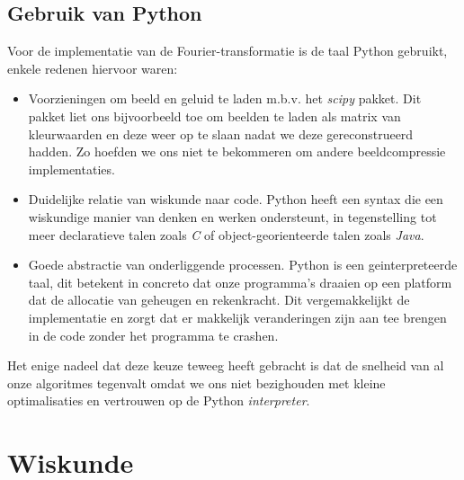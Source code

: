 \subsection{Gebruik van Python}
Voor de implementatie van de Fourier-transformatie is de taal Python gebruikt,
enkele redenen hiervoor waren:
\begin{itemize}
\item Voorzieningen om beeld en geluid te laden m.b.v. het \emph{scipy} pakket.
  Dit pakket liet ons bijvoorbeeld toe om beelden te laden als matrix van kleurwaarden en deze weer op te slaan
  nadat we deze gereconstrueerd hadden. Zo hoefden we ons niet te bekommeren om andere beeldcompressie implementaties.
\item Duidelijke relatie van wiskunde naar code. Python heeft een syntax die een wiskundige manier van denken en werken
  ondersteunt, in tegenstelling tot meer declaratieve talen zoals \emph{C} of object-georienteerde talen zoals \emph{Java}.
\item Goede abstractie van onderliggende processen. Python is een geinterpreteerde taal, dit betekent in concreto
  dat onze programma's draaien op een platform dat de allocatie van geheugen en rekenkracht. Dit vergemakkelijkt
  de implementatie en zorgt dat er makkelijk veranderingen zijn aan tee brengen in de code zonder het programma te crashen.
\end{itemize}
Het enige nadeel dat deze keuze teweeg heeft gebracht is dat de snelheid van al onze algoritmes tegenvalt
omdat we ons niet bezighouden met kleine optimalisaties en vertrouwen op de Python \emph{interpreter}.

\section{Wiskunde}

